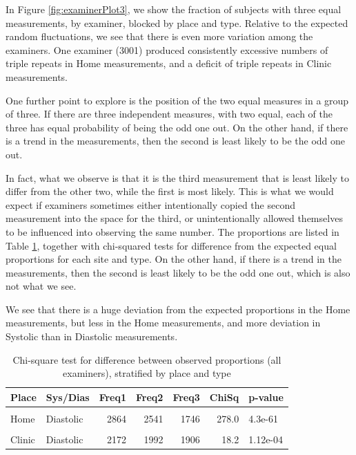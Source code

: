 \documentclass[
]{article}
\begin{document}
In Figure \ref{fig:examinerPlot3}, we show the fraction of subjects with three equal measurements, by examiner, blocked by place and type.
Relative to the expected random fluctuations, we see that there is even more variation among the examiners.
One examiner (3001) produced consistently excessive numbers of triple repeats in Home measurements, and a deficit of triple repeats in Clinic measurements.

One further point to explore is the position of the two equal measures in a group of three.
If there are three independent measures, with two equal, each of the three has equal probability of being the odd one out.
On the other hand, if there is a trend in the measurements, then the second is least likely to be the odd one out.

In fact, what we observe is that it is the third measurement that is least likely to differ from the other two, while the first is most likely.
This is what we would expect if examiners sometimes either intentionally copied the second measurement into the space for the third, or unintentionally allowed themselves to be influenced into observing the same number.
The proportions are listed in Table \ref{tab:proportionChisq}, together with chi-squared tests for difference from the expected equal proportions for each site and type.
On the other hand, if there is a trend in the measurements, then the second is least likely to be the odd one out, which is also not what we see.

We see that there is a huge deviation from the expected proportions in the Home measurements, but less in the Home measurements, and more deviation in Systolic than in Diastolic measurements.

\begin{table}[!h]
\centering
\caption{\label{tab:proportionChisq}Chi-square test for difference between observed proportions (all examiners), stratified by place and type}
\centering
\begin{tabular}[t]{llrrrrl}
\toprule
Place & Sys/Dias & Freq1 & Freq2 & Freq3 & ChiSq & p-value\\
\midrule
\cellcolor{gray!10}{Home} & \cellcolor{gray!10}{Systolic} & \cellcolor{gray!10}{2657} & \cellcolor{gray!10}{2149} & \cellcolor{gray!10}{1522} & \cellcolor{gray!10}{306.0} & \cellcolor{gray!10}{3.57e-67}\\
Home & Diastolic & 2864 & 2541 & 1746 & 278.0 & 4.3e-61\\
\cellcolor{gray!10}{Clinic} & \cellcolor{gray!10}{Systolic} & \cellcolor{gray!10}{1905} & \cellcolor{gray!10}{1702} & \cellcolor{gray!10}{1594} & \cellcolor{gray!10}{28.8} & \cellcolor{gray!10}{5.57e-07}\\
Clinic & Diastolic & 2172 & 1992 & 1906 & 18.2 & 1.12e-04\\
\bottomrule
\end{tabular}
\end{table}
\end{document}
